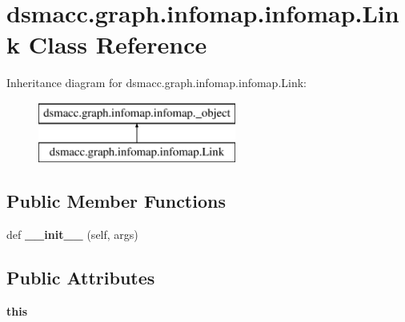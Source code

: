 \hypertarget{classdsmacc_1_1graph_1_1infomap_1_1infomap_1_1Link}{}\section{dsmacc.\+graph.\+infomap.\+infomap.\+Link Class Reference}
\label{classdsmacc_1_1graph_1_1infomap_1_1infomap_1_1Link}
Inheritance diagram for dsmacc.\+graph.\+infomap.\+infomap.\+Link\+:\begin{figure}[H]
\begin{center}
\leavevmode
\includegraphics[height=2.000000cm]{classdsmacc_1_1graph_1_1infomap_1_1infomap_1_1Link}
\end{center}
\end{figure}
\subsection*{Public Member Functions}
\begin{DoxyCompactItemize}
\item 
\mbox{\label{classdsmacc_1_1graph_1_1infomap_1_1infomap_1_1Link_a80daf9a6feb0e6b48c18c6d8b79f55e7}} 
def {\bfseries \+\_\+\+\_\+init\+\_\+\+\_\+} (self, args)
\end{DoxyCompactItemize}
\subsection*{Public Attributes}
\begin{DoxyCompactItemize}
\item 
\mbox{\label{classdsmacc_1_1graph_1_1infomap_1_1infomap_1_1Link_a1c5a1e9c2052e6d075bfaf4055289c70}} 
{\bfseries this}
\end{DoxyCompactItemize}
